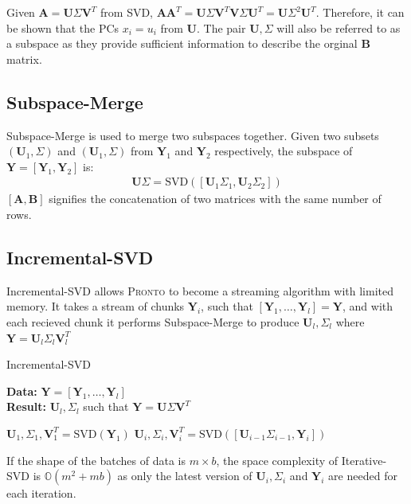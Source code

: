 Given $\mathbf{A} = \mathbf{U}\Sigma\mathbf{V}^T$ from SVD,
$\mathbf{AA}^T = \mathbf{U}\Sigma\mathbf{V}^T\mathbf{V}\Sigma\mathbf{U}^T =
\mathbf{U}\Sigma^2\mathbf{U}^T$. Therefore, it can be shown that the PCs
$x_i = u_i$ from $\mathbf{U}$. The pair $\mathbf{U}, \Sigma$ will also be
referred to as a subspace as they provide sufficient information to describe the
orginal $\mathbf{B}$ matrix.

\subsection{Subspace-Merge}
Subspace-Merge is used to merge two subspaces together. Given two subsets
$(\mathbf{U}_1, \Sigma)$ and $(\mathbf{U}_1, \Sigma)$ from $\mathbf{Y}_1$ and
$\mathbf{Y}_2$ respectively, the subspace of $\mathbf{Y} = [\mathbf{Y}_1,
\mathbf{Y}_2]$ is:
\begin{align}
    \mathbf{U}\Sigma = \text{SVD}([\mathbf{U}_1\Sigma_1, \mathbf{U}_2\Sigma_2])
\end{align}
$[\mathbf{A}, \mathbf{B}]$ signifies the concatenation of two matrices with the
same number of rows.

\subsection{Incremental-SVD}
Incremental-SVD allows \textsc{Pronto} to become a streaming algorithm with limited
memory. It takes a stream of chunks $\mathbf{Y}_i$, such that  $[\mathbf{Y}_1,
\ldots, \mathbf{Y}_l] = \mathbf{Y}$, and with each recieved chunk it performs
Subspace-Merge to produce $\mathbf{U}_l, \Sigma_l$ where $\mathbf{Y} =
\mathbf{U}_l\Sigma_l\mathbf{V}_l^T$

\begin{algorithm}
\caption{Incremental-SVD}
\textbf{Data:} $\mathbf{Y} = [\mathbf{Y}_1, \dots, \mathbf{Y}_l]$ \\
    \textbf{Result:} $\mathbf{U}_l, \Sigma_l$ such that $\mathbf{Y} =
    \mathbf{U}\Sigma\mathbf{V}^T$
\begin{algorithmic}
\State $\mathbf{U}_1, \Sigma_1, \mathbf{V}_1^T = \text{SVD}(\mathbf{Y}_1)$
\State $\mathbf{U}_i, \Sigma_i, \mathbf{V}_i^T = \text{SVD}([\mathbf{U}_{i-1}\Sigma_{i-1}, \mathbf{Y}_i])$
\EndFor
\end{algorithmic}
\end{algorithm}
If the shape of the batches of data is $m \times b$, the space complexity of
Iterative-SVD is $\mathbb{O}(m^2 + mb)$ as only the latest version of
$\mathbf{U}_i,\Sigma_i$ and $\mathbf{Y}_i$ are needed for each iteration.

